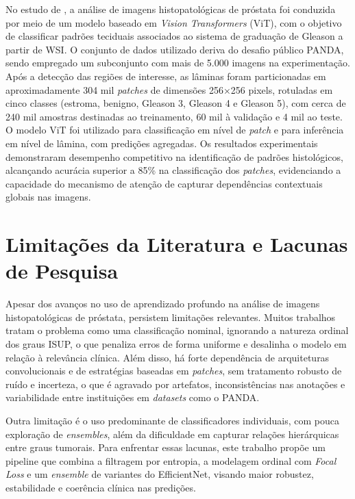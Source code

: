 No estudo de , a análise de imagens histopatológicas de próstata foi conduzida por meio de um modelo baseado em \textit{Vision Transformers} (ViT), com o objetivo de classificar padrões teciduais associados ao sistema de graduação de Gleason a partir de WSI. O conjunto de dados utilizado deriva do desafio público PANDA, sendo empregado um subconjunto com mais de 5.000 imagens na experimentação. Após a detecção das regiões de interesse, as lâminas foram particionadas em aproximadamente 304 mil \textit{patches} de dimensões 256×256 pixels, rotuladas em cinco classes (estroma, benigno, Gleason 3, Gleason 4 e Gleason 5), com cerca de 240 mil amostras destinadas ao treinamento, 60 mil à validação e 4 mil ao teste. O modelo ViT foi utilizado para classificação em nível de \textit{patch} e para inferência em nível de lâmina, com predições agregadas. Os resultados experimentais demonstraram desempenho competitivo na identificação de padrões histológicos, alcançando acurácia superior a 85\% na classificação dos \textit{patches}, evidenciando a capacidade do mecanismo de atenção de capturar dependências contextuais globais nas imagens. 

\section{Limitações da Literatura e Lacunas de Pesquisa}

Apesar dos avanços no uso de aprendizado profundo na análise de imagens histopatológicas de próstata, persistem limitações relevantes. Muitos trabalhos tratam o problema como uma classificação nominal, ignorando a natureza ordinal dos graus ISUP, o que penaliza erros de forma uniforme e desalinha o modelo em relação à relevância clínica. Além disso, há forte dependência de arquiteturas convolucionais e de estratégias baseadas em \textit{patches}, sem tratamento robusto de ruído e incerteza, o que é agravado por artefatos, inconsistências nas anotações e variabilidade entre instituições em \textit{datasets} como o PANDA.

Outra limitação é o uso predominante de classificadores individuais, com pouca exploração de \textit{ensembles}, além da dificuldade em capturar relações hierárquicas entre graus tumorais. Para enfrentar essas lacunas, este trabalho propõe um pipeline que combina a filtragem por entropia, a modelagem ordinal com \textit{Focal Loss} e um \textit{ensemble} de variantes do EfficientNet, visando maior robustez, estabilidade e coerência clínica nas predições.		